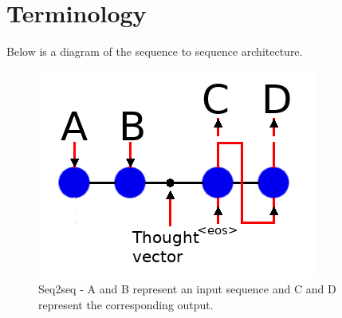 \chapter{Terminology}

\iffalse
Below is a diagram of the sequence to sequence architecture.

\begin{figure}[H]

\begin{center}

\includegraphics[scale=0.5]{diagram-nmt}

	
\end{center}

\caption[Sequence to Sequence]{Seq2seq - A and B represent an input sequence and C and D represent the corresponding output.}

\end{figure}


